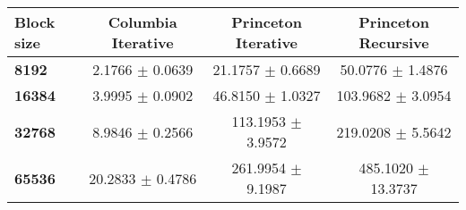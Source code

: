 \begin{tabular}{lccc}\toprule
\textbf{Block size}  & \textbf{Columbia Iterative} & \textbf{Princeton Iterative} & \textbf{Princeton Recursive}\\\midrule
\textbf{8192}  & 2.1766 $\pm$ 0.0639 & 21.1757 $\pm$ 0.6689 & 50.0776 $\pm$ 1.4876\\
\textbf{16384}  & 3.9995 $\pm$ 0.0902 & 46.8150 $\pm$ 1.0327 & 103.9682 $\pm$ 3.0954\\
\textbf{32768}  & 8.9846 $\pm$ 0.2566 & 113.1953 $\pm$ 3.9572 & 219.0208 $\pm$ 5.5642\\
\textbf{65536} & 20.2833 $\pm$ 0.4786 & 261.9954 $\pm$ 9.1987 & 485.1020 $\pm$ 13.3737\\
\bottomrule
\end{tabular}
